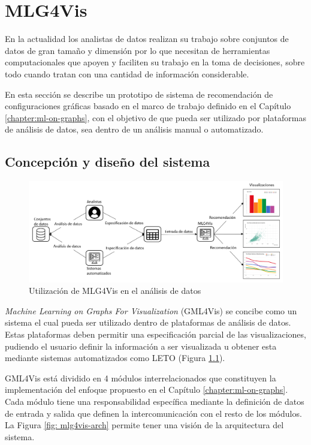 \chapter{MLG4Vis}\label{chapter:proposal}

En la actualidad los analistas de datos realizan su trabajo
sobre conjuntos de datos de gran tama\~no y dimensi\'on por lo que
necesitan de herramientas computacionales que apoyen y faciliten
su trabajo en la toma de decisiones, sobre todo cuando tratan con una
cantidad de informaci\'on considerable.

En esta secci\'on se describe un prototipo de sistema de recomendaci\'on de
configuraciones gr\'aficas basado en el marco de trabajo definido
en el Cap\'itulo \ref{chapter:ml-on-graphs}, con el objetivo de que pueda ser utilizado
por plataformas de an\'alisis de datos, sea dentro de un an\'alisis manual o 
automatizado.\\

\section{Concepci\'on y dise\~no del sistema}

\begin{figure}[h!]
    \includegraphics[width=\linewidth]{Graphics/mlg4vis.png}
    \caption{Utilizaci\'on de MLG4Vis en el an\'alisis de datos}
    \label{fig: mlg4vis}
\end{figure}


\textit{Machine Learning on Graphs For Visualization} (GML4Vis) se concibe como un
sistema el cual pueda ser utilizado dentro de plataformas de an\'alisis de datos. Estas plataformas
deben permitir una especificaci\'on parcial de las visualizaciones, pudiendo el
usuario definir la informaci\'on a ser visualizada u obtener esta mediante sistemas
automatizados como LETO (Figura \ref{fig: mlg4vis}).

GML4Vis est\'a dividido en 4 m\'odulos interrelacionados que
constituyen la implementaci\'on del enfoque propuesto en el Cap\'itulo \ref{chapter:ml-on-graphs}.
Cada m\'odulo
tiene una responsabilidad espec\'ifica mediante la definici\'on de datos
de entrada y salida que definen la intercomunicaci\'on con el resto de los
m\'odulos. La Figura \ref{fig: mlg4vis-arch} permite tener una
visi\'on de la arquitectura del sistema.

